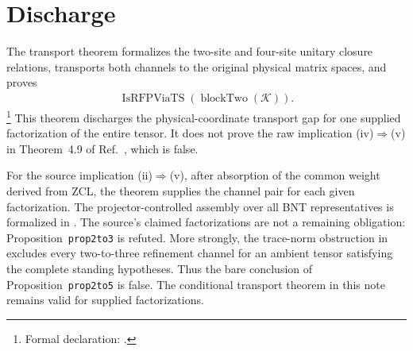 \documentclass{article}
\begin{document}
\section{Discharge}

The transport theorem formalizes the two-site and four-site unitary closure
relations, transports both channels to the original physical matrix spaces,
and proves
\begin{align}
    \operatorname{IsRFPViaTS}
        (\operatorname{blockTwo}(\mathcal K)).
    \label{eq:cpgsv17_mpdo_blocked_rfp_physical_transport_original_block_rfp}
\end{align}
\footnote{Formal declaration:
.}
This theorem discharges the physical-coordinate transport gap for one supplied
factorization of the entire tensor. It does not prove the raw implication
(iv)$\Rightarrow$(v) in Theorem~4.9 of
Ref.~\cite{Cirac2016MPDO_arXiv}, which is false.

For the source implication (ii)$\Rightarrow$(v), after absorption of the
common weight derived from ZCL, the theorem supplies the channel pair for each
given factorization. The projector-controlled assembly over all BNT
representatives is formalized in . The source's claimed
factorizations are not a remaining obligation: Proposition~\texttt{prop2to3}
is refuted. More strongly, the trace-norm obstruction in
 excludes every
two-to-three refinement channel for an ambient tensor satisfying the complete
standing hypotheses. Thus the bare conclusion of
Proposition~\texttt{prop2to5} is false. The conditional transport theorem in
this note remains valid for supplied factorizations.



\end{document}
